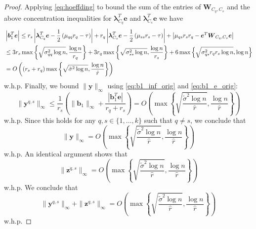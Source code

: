 \documentclass[twoside,11pt]{article}
\DeclareMathOperator{\pr}{Pr}
\newcommand{\e}{\bs {e}}
\newcommand{\bs}{\boldsymbol}
\newcommand{\0}{\bs{0}}
\newcommand{\rbra}[1]{\ensuremath{\left( #1 \right)}} %
\newcommand{\bra}[1]{\ensuremath{\left\{ #1 \right\}}} %
\begin{document}
\begin{proof}
Applying \eqref{eq:hoeffding} to bound the sum of the entries of
$\bs{W}_{C_q,C_s}$ and the above concentration inequalities
for $\bs{\lambda}_{C_q}^T \e$ and $\bs{\lambda}_{C_s}^T \e$
we have
\begin{align}
	& \left|\bs{b}_1^T \bs{e}\right|
		\leq r_s \left|\bs{\lambda}_{C_q}^T \bs{e} - \frac{1}
		{2}\left(\mu_{qq} r_q - \tau \right)\right|
		+ r_q\left|\bs{\lambda}_{C_s}^T \bs{e}
		- \frac{1}{2}\left(\mu_{ss} r_s - \tau\right)\right|
		+ \left|\mu_{qs} r_s r_q - \bs{e}^T \bs{W}_{C_q,C_s}\bs{e}\right|
		\notag \\
		& \leq 3 r_s \max\bra{ \sqrt{\sigma_{qq}^2 \log n},
			\frac{\log n}{r_q} }
			+ 3 r_q \max\bra{ \sqrt{\sigma_{ss}^2 \log n},
			\frac{\log n}{r_s} }
			+  6 \max \bra{ \sqrt{\sigma_{qs}^2 r_q r_s \log n}, \log n}
		\notag \\
		& = O \rbra{ (r_s + r_q) \max\bra{ \sqrt{\tilde \sigma^2 \log n},
			\frac{\log n}{\hat r} }  }\label{eq:b1_e_orig}
\end{align}
w.h.p.
Finally, we bound $\|\bs{y}\|_{\infty}$  using \eqref{eq:b1_inf_orig} and \eqref{eq:b1_e_orig}:
$$
	\|\bs{y}^{q,s}\|_{\infty}
	\leq \frac{1}{r_s}\left( \|\bs{b}_1\|_{\infty}
		+ \frac{|\bs{b}_1^T \bs{e}|}{r_q +r_s}\right)
	= O \rbra{ \max \bra{  \sqrt{ \frac{ \tilde{\sigma}^2 \log n}{\hat{r}} },
		\frac{ \log n}{\hat{r}} } }
$$
w.h.p. Since this holds for any $q,s \in\{1,\dots,k\}$ such that $q \neq s$, we conclude that
\begin{equation}
\label{eq:y_bound_orig}
\|\bs{y}\|_{\infty} = O \rbra{ \max \bra{  \sqrt{ \frac{ \tilde{\sigma}^2 \log n}{\hat{r}} },
		\frac{ \log n}{\hat{r}} } }
\end{equation}
w.h.p.
An identical argument shows that
\begin{equation}
\label{eq:z_bound_orig}
	\|\bs{z}^{q,s}\|_{\infty}
	= O \rbra{ \max \bra{  \sqrt{ \frac{ \tilde{\sigma}^2 \log n}{\hat{r}} },
		\frac{ \log n}{\hat{r}} } }
\end{equation}
w.h.p.
We conclude that
\begin{equation}
\label{eq:lemma42_known_c}
	\|\bs{y}^{q,s}\|_{\infty} +  \|\bs{z}^{q,s}\|_{\infty}
	= O \rbra{ \max \bra{  \sqrt{ \frac{ \tilde{\sigma}^2 \log n}{\hat{r}} },
		\frac{ \log n}{\hat{r}} } }
\end{equation}
w.h.p.
\end{proof}
\end{document}
